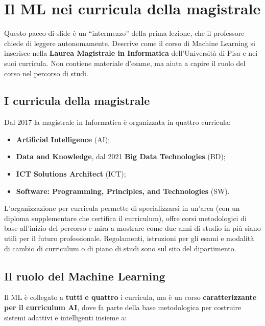 \chapter{Il ML nei curricula della magistrale}\label{ch-02}

Questo pacco di slide è un ``intermezzo'' della prima lezione, che il
professore chiede di leggere autonomamente. Descrive come il corso di
Machine Learning si inserisce nella \textbf{Laurea Magistrale in
Informatica} dell'Università di Pisa e nei suoi curricula. Non contiene
materiale d'esame, ma aiuta a capire il ruolo del corso nel percorso di
studi.

\section{I curricula della
magistrale}\label{i-curricula-della-magistrale}

Dal 2017 la magistrale in Informatica è organizzata in quattro
curricula:

\begin{itemize}
\tightlist
\item
  \textbf{Artificial Intelligence} (AI);
\item
  \textbf{Data and Knowledge}, dal 2021 \textbf{Big Data Technologies}
  (BD);
\item
  \textbf{ICT Solutions Architect} (ICT);
\item
  \textbf{Software: Programming, Principles, and Technologies} (SW).
\end{itemize}

L'organizzazione per curricula permette di specializzarsi in un'area
(con un diploma supplementare che certifica il curriculum), offre corsi
metodologici di base all'inizio del percorso e mira a mostrare come due
anni di studio in più siano utili per il futuro professionale.
Regolamenti, istruzioni per gli esami e modalità di cambio di curriculum
o di piano di studi sono sul sito del dipartimento.

\section{Il ruolo del Machine
Learning}\label{il-ruolo-del-machine-learning}

Il ML è collegato a \textbf{tutti e quattro} i curricula, ma è un corso
\textbf{caratterizzante per il curriculum AI}, dove fa parte della base
metodologica per costruire sistemi adattivi e intelligenti insieme a:

